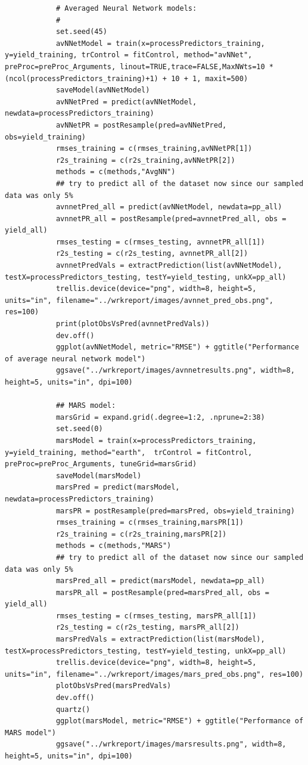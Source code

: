 \documentclass[letterpaper,12pt,titlepage,oneside,final]{report}
\begin{document}
\begin{multicols}{2}
\begin{verbatim}
            # Averaged Neural Network models:
            #
            set.seed(45)
            avNNetModel = train(x=processPredictors_training, y=yield_training, trControl = fitControl, method="avNNet", preProc=preProc_Arguments, linout=TRUE,trace=FALSE,MaxNWts=10 * (ncol(processPredictors_training)+1) + 10 + 1, maxit=500)
            saveModel(avNNetModel)
            avNNetPred = predict(avNNetModel, newdata=processPredictors_training)
            avNNetPR = postResample(pred=avNNetPred, obs=yield_training)
            rmses_training = c(rmses_training,avNNetPR[1])
            r2s_training = c(r2s_training,avNNetPR[2])
            methods = c(methods,"AvgNN")
            ## try to predict all of the dataset now since our sampled data was only 5%
            avnnetPred_all = predict(avNNetModel, newdata=pp_all)
            avnnetPR_all = postResample(pred=avnnetPred_all, obs = yield_all)
            rmses_testing = c(rmses_testing, avnnetPR_all[1])
            r2s_testing = c(r2s_testing, avnnetPR_all[2])
            avnnetPredVals = extractPrediction(list(avNNetModel), testX=processPredictors_testing, testY=yield_testing, unkX=pp_all)
            trellis.device(device="png", width=8, height=5, units="in", filename="../wrkreport/images/avnnet_pred_obs.png", res=100)
            print(plotObsVsPred(avnnetPredVals))
            dev.off()
            ggplot(avNNetModel, metric="RMSE") + ggtitle("Performance of average neural network model")        
            ggsave("../wrkreport/images/avnnetresults.png", width=8, height=5, units="in", dpi=100)

            ## MARS model:
            marsGrid = expand.grid(.degree=1:2, .nprune=2:38)
            set.seed(0)
            marsModel = train(x=processPredictors_training, y=yield_training, method="earth",  trControl = fitControl, preProc=preProc_Arguments, tuneGrid=marsGrid)
            saveModel(marsModel) 
            marsPred = predict(marsModel, newdata=processPredictors_training)
            marsPR = postResample(pred=marsPred, obs=yield_training)
            rmses_training = c(rmses_training,marsPR[1])
            r2s_training = c(r2s_training,marsPR[2])
            methods = c(methods,"MARS")
            ## try to predict all of the dataset now since our sampled data was only 5%
            marsPred_all = predict(marsModel, newdata=pp_all)
            marsPR_all = postResample(pred=marsPred_all, obs = yield_all)
            rmses_testing = c(rmses_testing, marsPR_all[1])
            r2s_testing = c(r2s_testing, marsPR_all[2])
            marsPredVals = extractPrediction(list(marsModel), testX=processPredictors_testing, testY=yield_testing, unkX=pp_all)
            trellis.device(device="png", width=8, height=5, units="in", filename="../wrkreport/images/mars_pred_obs.png", res=100)
            plotObsVsPred(marsPredVals)
            dev.off()
            quartz()
            ggplot(marsModel, metric="RMSE") + ggtitle("Performance of MARS model")        
            ggsave("../wrkreport/images/marsresults.png", width=8, height=5, units="in", dpi=100)


\end{verbatim}
\end{multicols}
\end{document}
